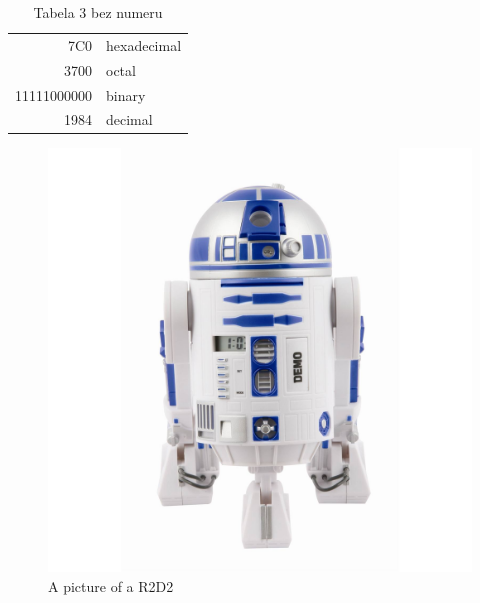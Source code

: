 \documentclass{article}
\begin{document}
\begin{table}
\begin{center}
\begin{tabular}{|r|l|}
\hline
7C0 & hexadecimal \\
3700 & octal \\ \cline{2-2}
11111000000 & binary \\ 
\hline
\hline 
1984 & decimal \\ \hline
\end{tabular}
\caption{Tabela 3 bez numeru}
\end{center}
\end{table}

\begin{figure}%
\caption{A picture of a R2D2}%
\centering
\includegraphics[width=\columnwidth]{R2D2.jpg}%
\end{figure}
\end{document}
